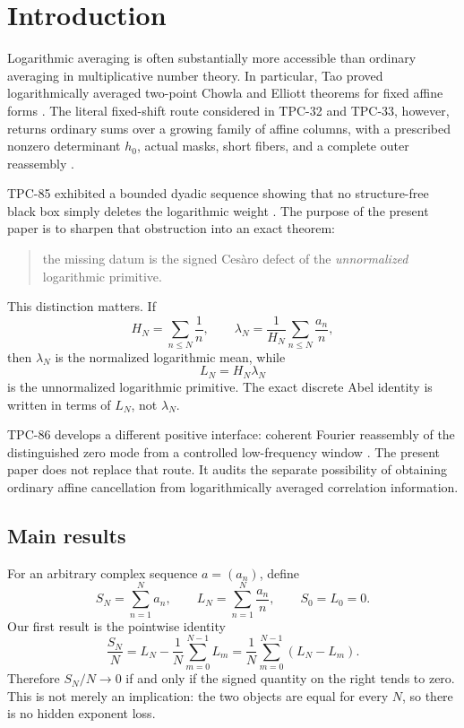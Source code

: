 \section{Introduction}
\label{sec:introduction}

Logarithmic averaging is often substantially more accessible than
ordinary averaging in multiplicative number theory.  In particular,
Tao proved logarithmically averaged two-point Chowla and Elliott
theorems for fixed affine forms \citep{Tao2016LogChowla}.  The
literal fixed-shift route considered in TPC-32 and TPC-33, however,
returns ordinary sums over a growing family of affine columns, with a
prescribed nonzero determinant \(h_0\), actual masks, short fibers,
and a complete outer reassembly \citep{WangTPC32,WangTPC33}.

TPC-85 exhibited a bounded dyadic sequence showing that no
structure-free black box simply deletes the logarithmic weight
\citep{WangTPC85}.  The purpose of the present paper is to sharpen
that obstruction into an exact theorem:
\begin{quote}
the missing datum is the signed Ces\`aro defect of the
\emph{unnormalized} logarithmic primitive.
\end{quote}
This distinction matters.  If
\[
 H_N=\sum_{n\le N}\frac1n,\qquad
 \lambda_N=\frac1{H_N}\sum_{n\le N}\frac{a_n}{n},
\]
then \(\lambda_N\) is the normalized logarithmic mean, while
\[
 L_N=H_N\lambda_N
\]
is the unnormalized logarithmic primitive.  The exact discrete Abel
identity is written in terms of \(L_N\), not \(\lambda_N\).

TPC-86 develops a different positive interface: coherent Fourier
reassembly of the distinguished zero mode from a controlled
low-frequency window \citep{WangTPC86}.  The present paper does not
replace that route.  It audits the separate possibility of obtaining
ordinary affine cancellation from logarithmically averaged
correlation information.

\subsection{Main results}

For an arbitrary complex sequence \(a=(a_n)\), define
\[
 S_N=\sum_{n=1}^Na_n,\qquad
 L_N=\sum_{n=1}^N\frac{a_n}{n},\qquad S_0=L_0=0.
\]
Our first result is the pointwise identity
\begin{equation}
 \frac{S_N}{N}
 =L_N-\frac1N\sum_{m=0}^{N-1}L_m
 =\frac1N\sum_{m=0}^{N-1}(L_N-L_m).
\label{eq:intro-abel}
\end{equation}
Therefore \(S_N/N\to0\) if and only if the signed quantity on the
right tends to zero.  This is not merely an implication: the two
objects are equal for every \(N\), so there is no hidden exponent
loss.

